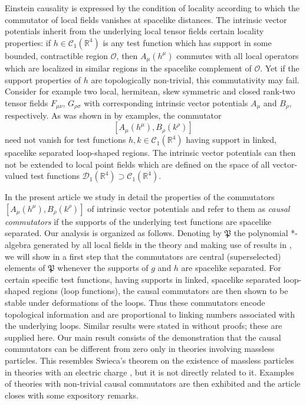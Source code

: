 \documentclass[11pt]{article}
\numberwithin{equation}{section}
\newcommand{\RR}{{\mathbb R}}
\newcommand{\Cc}{{\mathcal{C}}}
\newcommand{\Dc}{{\mathcal{D}}}
\newcommand{\Oc}{{\mathcal{O}}}
\newcommand{\fP}{{\mathfrak P}}
\begin{document}
\medskip
Einstein causality is expressed by the condition of locality 
according to which the commutator of local fields vanishes
at spacelike distances. The intrinsic vector potentials inherit
from the underlying local tensor fields certain locality properties:
if $h \in \Cc_1(\RR^4)$ is any test function which has support in some
bounded, contractible region $\Oc$, then $A_\mu(h^\mu)$ 
commutes with all local operators which are localized in similar 
regions in the spacelike complement of $\Oc$. Yet if the 
support properties of $h$ are topologically non-trivial,
this commutativity may fail. Consider for example  
two local, hermitean, skew symmetric and closed 
rank-two tensor fields $F_{\mu \nu}$, $G_{\rho \sigma}$
with corresponding intrinsic vector potentials $A_\mu$ and
$B_\rho$, respectively. As was shown in 
\cite{Roberts,BuCiRuVa2} 
by examples, the commutator 
%
\begin{equation}
\label{eq.comm}
[A_\mu(h^\mu), B_\rho(k^\rho)]
\end{equation}
%
need not vanish for test functions $h, k \in \Cc_1(\RR^4)$
having support in linked, spacelike separated loop-shaped 
regions. The intrinsic vector potentials can then
not be extended to local point fields 
which are defined on the space of 
all vector-valued test functions $\Dc_1(\RR^4) \supset \Cc_1(\RR^4)$. 

\medskip
In the present article we study in detail the properties 
of the commutators $[A_\mu(h^\mu), B_\rho(k^\rho)]$ 
of intrinsic vector potentials and refer to them as
\textit{causal commutators} if the supports of the
underlying test functions are spacelike \mbox{separated}. 
Our analysis is organized as follows. 
Denoting by $\fP$ the \mbox{polynomial} *-algebra generated by 
all local fields in the theory and making use of results in 
\cite{BuCiRuVa1}, we will show in a first step that the commutators are
central (superselected) elements of $\fP$ whenever the supports of 
$g$ and $h$ are spacelike separated. For certain specific 
test functions, having supports in linked, spacelike separated 
loop-shaped regions (loop functions), the causal commutators are 
then shown to be stable under deformations of the loops.
Thus these commutators encode topological information
and are proportional to linking numbers associated
with the underlying loops. Similar results were stated in 
\cite{Roberts} without proofs; these are supplied here. 
Our main result consists 
of the demonstration that the causal commutators can be different from zero 
only in theories involving massless particles. 
This resembles Swieca's theorem on the existence 
of massless particles in theories with an electric charge
\cite{Sw}, but it is not directly related to it. 
Examples of theories with non-trivial causal commutators 
are then exhibited and the article closes with some 
expository remarks. 
\end{document}
